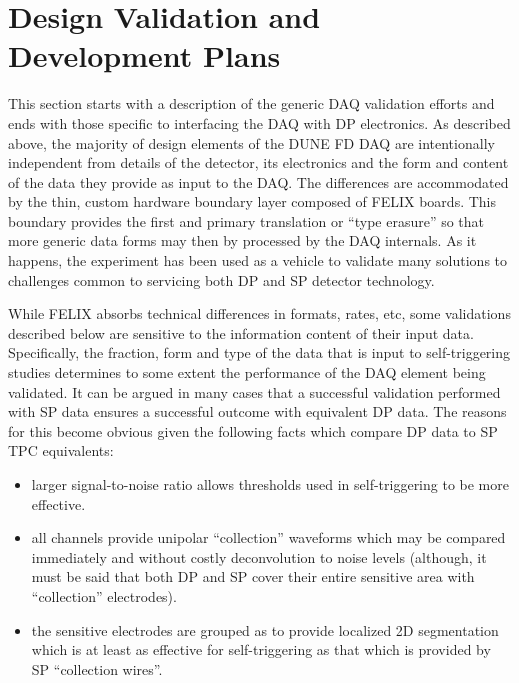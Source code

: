 \section{Design Validation and Development Plans}
\label{sec:daq:validation}


This section starts with a description of the generic DAQ validation
efforts and ends with those specific to interfacing the DAQ with DP
electronics. 
As described above, the majority of design elements of the DUNE FD DAQ
are intentionally independent from details of the detector, its
electronics and the form and content of the data they provide as input
to the DAQ. 
The differences are accommodated by the thin, custom hardware boundary
layer composed of FELIX boards. 
This boundary provides the first and primary translation or ``type
erasure'' so that more generic data forms may then by processed by the
DAQ internals.
As it happens, the  experiment has been used as a vehicle to
validate many solutions to challenges common to servicing both DP and SP
detector technology.

While FELIX absorbs technical differences in formats, rates, etc, some
validations described below are sensitive to the information content of
their input data. 
Specifically, the fraction, form and type of the data that is input to
self-triggering studies determines to some extent the performance of the
DAQ element being validated.
It can be argued in many cases that a successful validation performed
with SP data ensures a successful outcome with equivalent DP data.
The reasons for this become obvious given the following facts which
compare DP  data to SP TPC equivalents:
\begin{itemize}
\item larger signal-to-noise ratio allows thresholds used in
  self-triggering to be more effective.
\item all channels provide unipolar ``collection'' waveforms which may
  be compared immediately and without costly deconvolution to noise
  levels (although, it must be said that both DP and SP cover their
  entire sensitive area with ``collection'' electrodes).
\item the sensitive electrodes are grouped as to provide localized 2D
  segmentation which is at least as effective for self-triggering as
  that which is provided by SP ``collection wires''.
\end{itemize}


